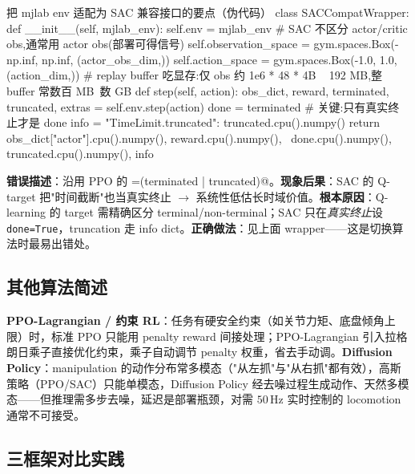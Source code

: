 \begin{codebox}[Python]{把 mjlab env 适配为 SAC 兼容接口的要点（伪代码）}
class SACCompatWrapper:
    def __init__(self, mjlab_env):
        self.env = mjlab_env
        # SAC 不区分 actor/critic obs,通常用 actor obs(部署可得信号)
        self.observation_space = gym.spaces.Box(-np.inf, np.inf, (actor_obs_dim,))
        self.action_space = gym.spaces.Box(-1.0, 1.0, (action_dim,))
        # replay buffer 吃显存:仅 obs 约 1e6 * 48 * 4B ~ 192 MB,整 buffer 常数百 MB~数 GB
    def step(self, action):
        obs_dict, reward, terminated, truncated, extras = self.env.step(action)
        done = terminated                # 关键:只有真实终止才是 done
        info = {"TimeLimit.truncated": truncated.cpu().numpy()}
        return obs_dict["actor"].cpu().numpy(), reward.cpu().numpy(), \
               done.cpu().numpy(), truncated.cpu().numpy(), info
\end{codebox}

\begin{pitfall}
\textbf{错误描述}：沿用 PPO 的 \verb@dones=(terminated | truncated)@。\textbf{现象后果}：SAC 的 Q-target 把"时间截断"也当真实终止 $\to$ 系统性低估长时域价值。\textbf{根本原因}：Q-learning 的 target 需精确区分 terminal/non-terminal；SAC 只在\emph{真实终止}设 \verb|done=True|，truncation 走 info dict。\textbf{正确做法}：见上面 wrapper——这是切换算法时最易出错处。
\end{pitfall}

\subsection{其他算法简述}

\textbf{PPO-Lagrangian / 约束 RL}：任务有硬安全约束（如关节力矩、底盘倾角上限）时，标准 PPO 只能用 penalty reward 间接处理；PPO-Lagrangian 引入拉格朗日乘子直接优化约束，乘子自动调节 penalty 权重，省去手动调。\textbf{Diffusion Policy}：manipulation 的动作分布常多模态（"从左抓"与"从右抓"都有效），高斯策略（PPO/SAC）只能单模态，Diffusion Policy 经去噪过程生成动作、天然多模态——但推理需多步去噪，延迟是部署瓶颈，对需 $50\,$Hz 实时控制的 locomotion 通常不可接受。

\subsection{三框架对比实践}

